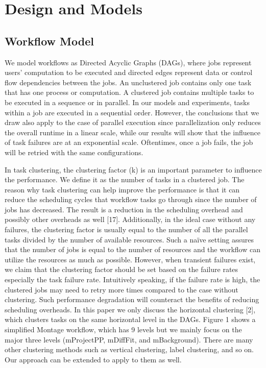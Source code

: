 \documentclass{IOS-Book-Article}
\begin{document}
\section{Design and Models}

\subsection{Workflow Model}

We model workflows as Directed Acyclic Graphs (DAGs), where jobs represent users’ computation to be executed and directed edges represent data or control flow dependencies between the jobs. An unclustered job contains only one task that has one process or computation. A clustered job contains multiple tasks to be executed in a sequence or in parallel. In our models and experiments, tasks within a job are executed in a sequential order. However, the conclusions that we draw also apply to the case of parallel execution since parallelization only reduces the overall runtime in a linear scale, while our results will show that the influence of task failures are at an exponential scale. Oftentimes, once a job fails, the job will be retried with the same configurations. 


In task clustering, the clustering factor (k) is an important parameter to influence the performance. We define it as the number of tasks in a clustered job. The reason why task clustering can help improve the performance is that it can reduce the scheduling cycles that workflow tasks go through since the number of jobs has decreased. The result is a reduction in the scheduling overhead and possibly other overheads as well [17]. Additionally, in the ideal case without any failures, the clustering factor is usually equal to the number of all the parallel tasks divided by the number of available resources. Such a naïve setting assures that the number of jobs is equal to the number of resources and the workflow can utilize the resources as much as possible. However, when transient failures exist, we claim that the clustering factor should be set based on the failure rates especially the task failure rate. Intuitively speaking, if the failure rate is high, the clustered jobs may need to retry more times compared to the case without clustering. Such performance degradation will counteract the benefits of reducing scheduling overheads. 
In this paper we only discuss the horizontal clustering [2], which clusters tasks on the same horizontal level in the DAGs. Figure 1 shows a simplified Montage workflow, which has 9 levels but we mainly focus on the major three levels (mProjectPP, mDiffFit, and mBackground). There are many other clustering methods such as vertical clustering, label clustering, and so on. Our approach can be extended to apply to them as well. 
\end{document}
